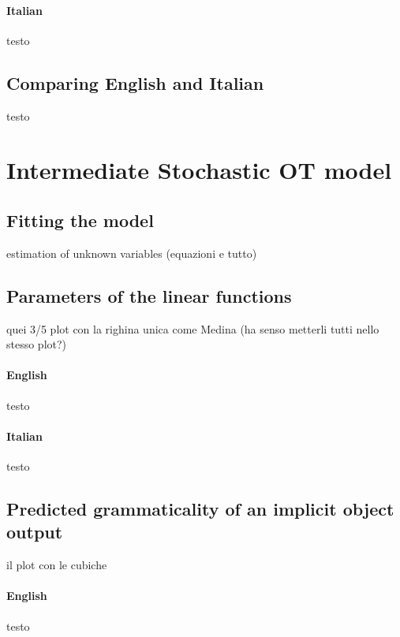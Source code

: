 \paragraph{Italian} testo


\subsection{Comparing English and Italian} 

testo



\section{Intermediate Stochastic OT model} 


\subsection{Fitting the model} 

estimation of unknown variables (equazioni e tutto)


\subsection{Parameters of the linear functions} 

quei 3/5 plot con la righina unica come Medina (ha senso metterli tutti nello stesso plot?)

\paragraph{English} testo

\paragraph{Italian} testo


\subsection{Predicted grammaticality of an implicit object output} 

il plot con le cubiche

\paragraph{English} testo

